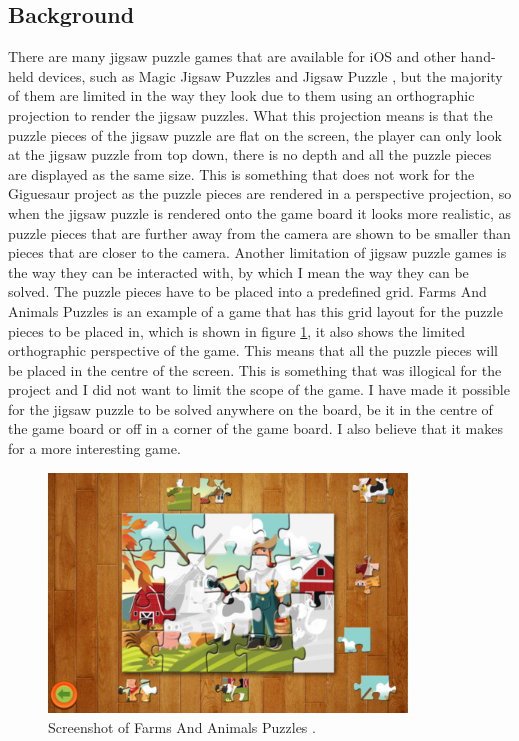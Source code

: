 \documentclass{article}
\begin{document}
\subsection{Background}
There are many jigsaw puzzle games that are available for iOS and other hand-held devices, such as Magic Jigsaw Puzzles \cite{ref:MagicJigsaw} and Jigsaw Puzzle \cite{ref:JigsawPuzzle}, but the majority of them are limited in the way they look due to them using an orthographic projection to render the jigsaw puzzles. What this projection means is that the puzzle pieces of the jigsaw puzzle are flat on the screen, the player can only look at the jigsaw puzzle from top down, there is no depth and all the puzzle pieces are displayed as the same size. This is something that does not work for the Giguesaur project as the puzzle pieces are rendered in a perspective projection, so when the jigsaw puzzle is rendered onto the game board it looks more realistic, as puzzle pieces that are further away from the camera are shown to be smaller than pieces that are closer to the camera. Another limitation of jigsaw puzzle games is the way they can be interacted with, by which I mean the way they can be solved. The puzzle pieces have to be placed into a predefined grid. Farms And Animals Puzzles \cite{ref:FarmPuzzle} is an example of a game that has this grid layout for the puzzle pieces to be placed in, which is shown in figure \ref{fig:FarmsAnimals}, it also shows the limited orthographic perspective of the game. This means that all the puzzle pieces will be placed in the centre of the screen. This is something that was illogical for the project and I did not want to limit the scope of the game. I have made it possible for the jigsaw puzzle to be solved anywhere on the board, be it in the centre of the game board or off in a corner of the game board. I also believe that it makes for a more interesting game.

\begin{figure}[ht]
\begin{center}
\includegraphics[width=0.85\textwidth]{images/FarmAnimalsJigsawImage}
\caption{Screenshot of Farms And Animals Puzzles \cite{img:FarmPuzzle}.}
\label{fig:FarmsAnimals}
\end{center}
\end{figure}
\end{document}
